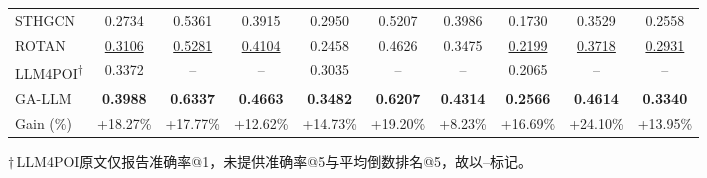 \begin{table}[htbp]
{\begin{tabular}{lccccccccc}
        STHGCN & 0.2734 & 0.5361 & 0.3915 & 0.2950 & 0.5207 & 0.3986 & 0.1730 & 0.3529 & 0.2558 \\
        ROTAN & \underline{0.3106} & \underline{0.5281} & \underline{0.4104} & 0.2458 & 0.4626 & 0.3475 & \underline{0.2199} & \underline{0.3718} & \underline{0.2931} \\
        LLM4POI\textsuperscript{$\dagger$} & 0.3372 & -- & -- & 0.3035 & -- & -- & 0.2065 & -- & -- \\
        \midrule
        GA-LLM & \textbf{0.3988} & \textbf{0.6337} & \textbf{0.4663} & \textbf{0.3482} & \textbf{0.6207} & \textbf{0.4314} & \textbf{0.2566} & \textbf{0.4614} & \textbf{0.3340} \\
        \rowcolor{TokBg}
        Gain (\%) & +18.27\% & +17.77\% & +12.62\% & +14.73\% & +19.20\% & +8.23\% & +16.69\% & +24.10\% & +13.95\% \\
        \bottomrule
    \end{tabular}}

    \vspace{2pt}
    {\footnotesize $\dagger$\,LLM4POI原文仅报告准确率@1，未提供准确率@5与平均倒数排名@5，故以--标记。}
\end{table}

